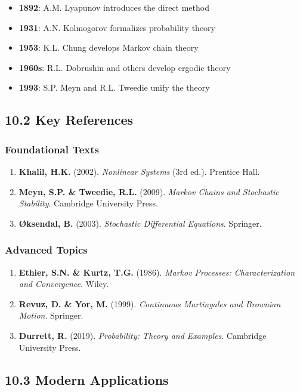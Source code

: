 \documentclass{amsart}
\theoremstyle{plain}
\theoremstyle{definition}
\theoremstyle{remark}
\begin{document}
\begin{itemize}
	\item \textbf{1892}: A.M. Lyapunov introduces the direct method
	\item \textbf{1931}: A.N. Kolmogorov formalizes probability theory
	\item \textbf{1953}: K.L. Chung develops Markov chain theory
	\item \textbf{1960s}: R.L. Dobrushin and others develop ergodic theory
	\item \textbf{1993}: S.P. Meyn and R.L. Tweedie unify the theory
\end{itemize}

\subsection{10.2 Key References}

\subsubsection{Foundational Texts}

\begin{enumerate}
	\item \textbf{Khalil, H.K.} (2002). \textit{Nonlinear Systems} (3rd ed.). Prentice Hall.
	\item \textbf{Meyn, S.P. \& Tweedie, R.L.} (2009). \textit{Markov Chains and Stochastic Stability}. Cambridge University Press.
	\item \textbf{Øksendal, B.} (2003). \textit{Stochastic Differential Equations}. Springer.
\end{enumerate}

\subsubsection{Advanced Topics}

\begin{enumerate}
	\item \textbf{Ethier, S.N. \& Kurtz, T.G.} (1986). \textit{Markov Processes: Characterization and Convergence}. Wiley.
	\item \textbf{Revuz, D. \& Yor, M.} (1999). \textit{Continuous Martingales and Brownian Motion}. Springer.
	\item \textbf{Durrett, R.} (2019). \textit{Probability: Theory and Examples}. Cambridge University Press.
\end{enumerate}

\subsection{10.3 Modern Applications}
\end{document}
